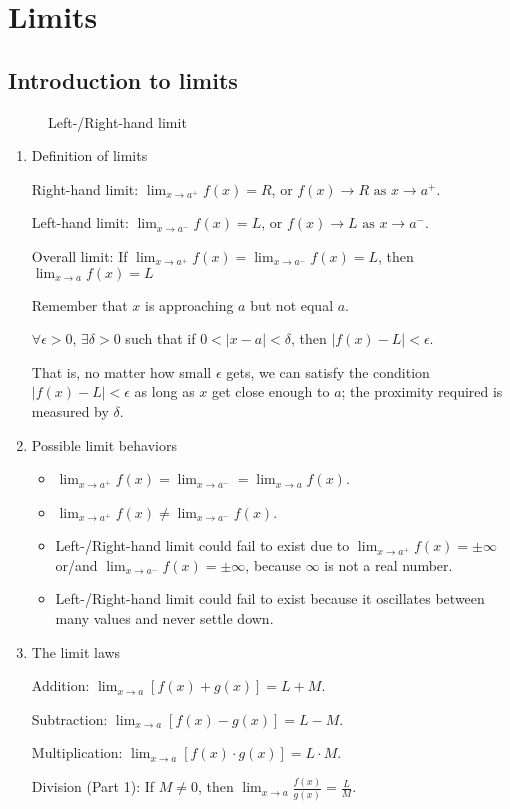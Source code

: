 %
\chapter{Limits}
\section{Introduction to limits}
\begin{figure}[H]
    \centering
    \caption{Left-/Right-hand limit}
\end{figure}
\begin{enumerate}
    \item Definition of limits

        Right-hand limit: $\lim_{x\to a^+} f(x)=R$, or $f(x)\to R\text{ as }x\to a^+$.

        Left-hand limit: $\lim_{x\to a^-} f(x)=L$, or $f(x)\to L\text{ as }x\to a^-$.

        Overall limit: If $\lim_{x\to a^+} f(x)=\lim_{x\to a^-} f(x)=L$, then $\lim_{x\to a} f(x)=L$

        Remember that $x$ is approaching $a$ but not equal $a$.
        \begin{definition}
            $\forall\epsilon>0$, $\exists\delta>0$ such that if $0<|x-a|<\delta$, then $|f(x)-L|<\epsilon$.

            That is, no matter how small $\epsilon$ gets, we can satisfy the condition $|f(x)-L|<\epsilon$ as long as $x$ get close enough to $a$; the proximity required is measured by $\delta$.
        \end{definition}
    \item Possible limit behaviors
        \begin{itemize}
            \item $\lim_{x\to a^+} f(x)=\lim_{x\to a^-}=\lim_{x\to a} f(x)$.
            \item $\lim_{x\to a^+} f(x)\neq\lim_{x\to a^-} f(x)$.
            \item Left-/Right-hand limit could fail to exist due to $\lim_{x\to a^+} f(x)=\pm\infty$ or/and $\lim_{x\to a^-} f(x)=\pm\infty$, because $\infty$ is not a real number.
            \item Left-/Right-hand limit could fail to exist because it oscillates between many values and never settle down.
        \end{itemize}
    \item The limit laws

        Addition: $\lim_{x\to a} [f(x)+g(x)]=L+M$.

        Subtraction: $\lim_{x\to a} [f(x)-g(x)]=L-M.$

        Multiplication: $\lim_{x\to a} [f(x)\cdot g(x)]=L\cdot M$.

        Division (Part 1): If $M\neq0$, then $\lim_{x\to a} \frac{f(x)}{g(x)}=\frac{L}{M}$.
\end{enumerate}

